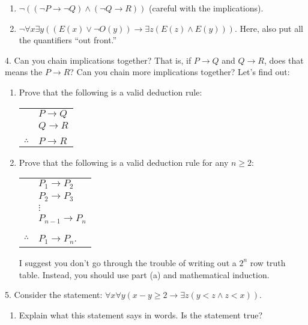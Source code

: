 \documentclass[10pt,]{book}
\theoremstyle{plain}
\theoremstyle{definition}
\theoremstyle{definition}
\theoremstyle{definition}
\numberwithin{equation}{chapter}
\newcommand{\hrulethin}  {\noalign{\hrule height 0.04em}}
\def\imp{\rightarrow}
\newcommand{\lt}{ < }
\begin{document}
\begin{exerciselist}
\begin{enumerate}[label=(\alph*)]
\item\hypertarget{li-1182}{}\(\neg((\neg P \imp \neg Q) \wedge (\neg Q \imp R))\) (careful with the implications).

\item\hypertarget{li-1183}{}\(\neg \forall x \exists y ((E(x) \vee \neg O(y)) \imp \exists z (E(z) \wedge E(y)))\). Here, also put all the quantifiers ``out front.''%
\end{enumerate}
\par\smallskip
\item[4.]\hypertarget{exercise-258}{}
            Can you chain implications together? That is, if \(P \imp Q\) and \(Q \imp R\), does that means the \(P \imp R\)? Can you chain more implications together? Let's find out:
\leavevmode%
\begin{enumerate}[label=(\alph*)]
\item\hypertarget{li-1184}{}
                Prove that the following is a valid deduction rule:
                \begin{tabular}{ll}
&\(P \imp Q\)\tabularnewline[0pt]
&\(Q \imp R\)\tabularnewline[0pt]
&\tabularnewline\hrulethin
\(\therefore\)&\(P \imp R\)
\end{tabular}


\item\hypertarget{li-1185}{}
                Prove that the following is a valid deduction rule for any \(n \ge 2\):
                \begin{tabular}{ll}
&\(P_1 \imp P_2\)\tabularnewline[0pt]
&\(P_2 \imp P_3\)\tabularnewline[0pt]
&\(\vdots\)\tabularnewline[0pt]
&\(P_{n-1} \imp P_n\)\tabularnewline[0pt]
&\tabularnewline\hrulethin
\(\therefore\)&\(P_1 \imp P_n\).
\end{tabular}

                I suggest you don't go through the trouble of writing out a \(2^n\) row truth table. Instead, you should use part (a) and mathematical induction.


\end{enumerate}
\par\smallskip
\item[5.]\hypertarget{exercise-259}{}
            Consider the statement: \(\forall x \forall y (x-y \ge 2 \imp \exists z (y \lt  z \wedge z \lt  x))\).
\leavevmode%
\begin{enumerate}[label=(\alph*)]
\item\hypertarget{li-1186}{}
                Explain what this statement says in words. Is the statement true?



\end{enumerate}
\end{exerciselist}
\end{document}
